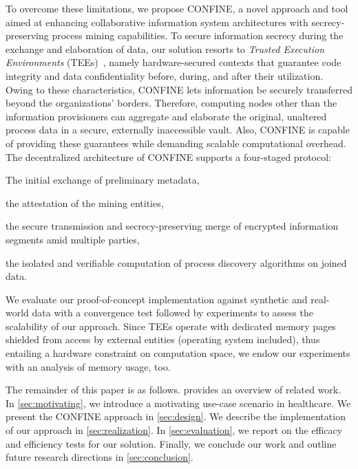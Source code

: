 To overcome these limitations, we propose CONFINE, a novel approach and tool aimed at enhancing collaborative information system architectures with secrecy-preserving process mining capabilities. To secure information secrecy during the exchange and elaboration of data, our solution resorts to \emph{Trusted Execution Environments} (TEEs)~\cite{DBLP:conf/trustcom/SabtAB15}, namely hardware-secured contexts that guarantee code integrity and data confidentiality before, during, and after their utilization. Owing to these characteristics, CONFINE lets information be securely transferred beyond the organizations' borders. Therefore, computing nodes other than the information provisioners can aggregate and elaborate the original, unaltered process data in a secure, externally inaccessible vault. Also, CONFINE is capable of providing these guarantees while demanding scalable computational overhead. 
%
The decentralized architecture of CONFINE supports a four-staged protocol:
%
\begin{inparaenum}
	\item The initial exchange of preliminary metadata,
	\item the attestation of the mining entities,
	\item the secure transmission and secrecy-preserving merge of encrypted information segments amid multiple parties,
	\item the isolated and verifiable computation of process discovery algorithms on joined data.
\end{inparaenum}
%
We evaluate our proof-of-concept implementation against synthetic and real-world data with a convergence test followed by experiments to assess the scalability of our approach.
Since TEEs operate with dedicated memory pages shielded from access by external entities (operating system included), thus entailing a hardware constraint on computation space, we endow our experiments with an analysis of memory usage, too.





The remainder of this paper is as follows.  provides an overview of related work. %
In \cref{sec:motivating}, we introduce a motivating use-case scenario in healthcare. We present the CONFINE approach in \cref{sec:design}. We describe the implementation of our approach in \cref{sec:realization}. %
In \cref{sec:evaluation}, we report on the efficacy and efficiency tests for our solution.
Finally, we conclude our work and outline future research directions in \cref{sec:conclusion}.